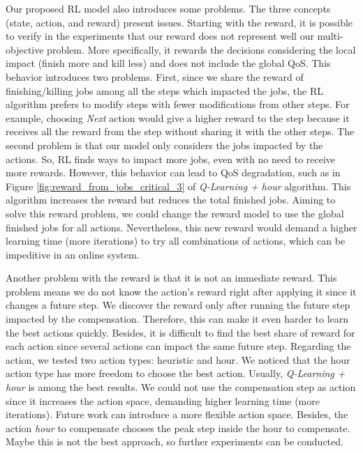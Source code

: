 Our proposed RL model also introduces some problems. The three concepts (state, action, and reward) present issues. Starting with the reward, it is possible to verify in the experiments that our reward does not represent well our multi-objective problem. More specifically, it rewards the decisions considering the local impact (finish more and kill less) and does not include the global QoS. This behavior introduces two problems. First, since we share the reward of finishing/killing jobs among all the steps which impacted the jobs, the RL algorithm prefers to modify steps with fewer modifications from other steps. For example, choosing \emph{Next} action would give a higher reward to the step because it receives all the reward from the step without sharing it with the other steps. The second problem is that our model only considers the jobs impacted by the actions. So, RL finds ways to impact more jobs, even with no need to receive more rewards. However, this behavior can lead to QoS degradation, such as in Figure \ref{fig:reward_from_jobs_critical_3} of \emph{Q-Learning + hour} algorithm. This algorithm increases the reward but reduces the total finished jobs. Aiming to solve this reward problem, we could change the reward model to use the global finished jobs for all actions. Nevertheless, this new reward would demand a higher learning time (more iterations) to try all combinations of actions, which can be impeditive in an online system. 

Another problem with the reward is that it is not an immediate reward. This problem means we do not know the action's reward right after applying it since it changes a future step. We discover the reward only after running the future step impacted by the compensation. Therefore, this can make it even harder to learn the best actions quickly. Besides, it is difficult to find the best share of reward for each action since several actions can impact the same future step. Regarding the action, we tested two action types: heuristic and hour. We noticed that the hour action type has more freedom to choose the best action. Usually, \emph{Q-Learning + hour} is among the best results. We could not use the compensation step as action since it increases the action space, demanding higher learning time (more iterations). Future work can introduce a more flexible action space. Besides, the action \textit{hour} to compensate chooses the peak step inside the hour to compensate. Maybe this is not the best approach, so further experiments can be conducted.

